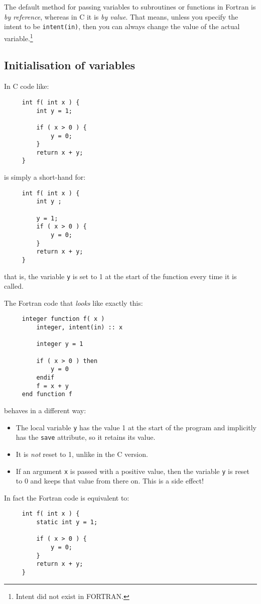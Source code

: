 The default method for passing variables to subroutines or functions in Fortran is \emph{by reference},
whereas in C it is \emph{by value}. That means, unless you specify the intent to be \verb+intent(in)+,
then you can always change the value of the actual variable.\footnote{Intent did not exist in FORTRAN.}

\subsection{Initialisation of variables}
In C code like:
\begin{verbatim}
     int f( int x ) {
         int y = 1;

         if ( x > 0 ) {
             y = 0;
         }
         return x + y;
     }
\end{verbatim}

\noindent is simply a short-hand for:
\begin{verbatim}
     int f( int x ) {
         int y ;

         y = 1;
         if ( x > 0 ) {
             y = 0;
         }
         return x + y;
     }
\end{verbatim}

\noindent that is, the variable \verb+y+ is set to 1 at the start of the function every time it is
called.

The Fortran code that \emph{looks} like exactly this:
\begin{verbatim}
     integer function f( x )
         integer, intent(in) :: x

         integer y = 1

         if ( x > 0 ) then
             y = 0
         endif
         f = x + y
     end function f
\end{verbatim}
\noindent behaves in a different way:

\begin{itemize}
\item
The local variable \verb+y+ has the value 1 at the start of the program and implicitly has the \verb+save+ attribute,
so it retains its value.
\item
It is \emph{not} reset to 1, unlike in the C version.
\item
If an argument \verb+x+ is passed with a positive value, then the variable \verb+y+ is reset to 0 and keeps that
value from there on. This is a side effect!
\end{itemize}

In fact the Fortran code is equivalent to:
\begin{verbatim}
     int f( int x ) {
         static int y = 1;

         if ( x > 0 ) {
             y = 0;
         }
         return x + y;
     }
\end{verbatim}

